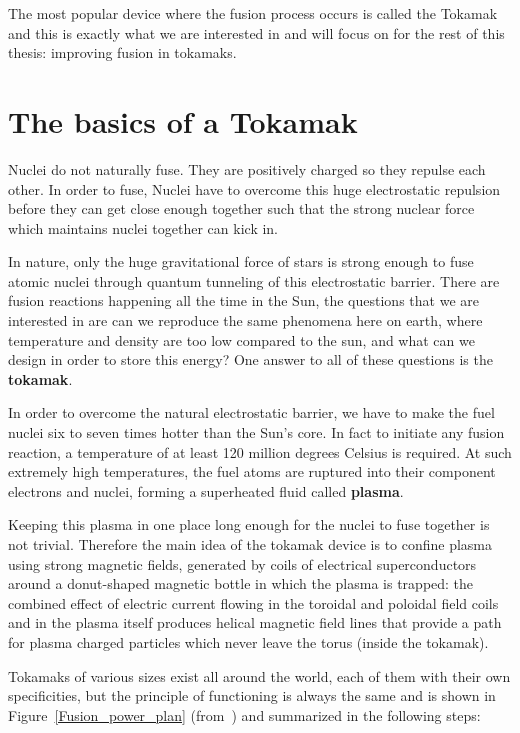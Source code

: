 \documentclass[12pt,lot, lof]{puthesis}
\begin{document}
The most popular device where the fusion process occurs is called the Tokamak and this is exactly what we are interested in and will focus on for the rest of this thesis: improving fusion in tokamaks.

\section{The basics of a Tokamak}

Nuclei do not naturally fuse. They are positively charged so they repulse each other. In order to fuse, Nuclei have to overcome this huge electrostatic repulsion before they can get close enough together such that the strong nuclear force which maintains nuclei together can kick in.

In nature, only the huge gravitational force of stars is strong enough to fuse atomic nuclei  through quantum tunneling of this electrostatic barrier. There are fusion reactions happening all the time in the Sun, the questions that we are interested in are can we reproduce the same phenomena here on earth, where temperature and density are too low compared to the sun, and what can we design in order to store this energy? One answer to all of these questions is the \textbf{tokamak}.

In order to overcome the natural electrostatic barrier, we have to make the fuel nuclei six to seven times hotter than the Sun's core. In fact to initiate any fusion reaction, a temperature of at least 120 million degrees Celsius is required. At such extremely high temperatures, the fuel atoms are ruptured into their component electrons and nuclei, forming a superheated fluid called \textbf{plasma}.

Keeping this plasma in one place long enough for the nuclei to fuse together is not trivial. Therefore the main idea of the tokamak device is to confine plasma using strong magnetic fields, generated by coils of electrical superconductors around a donut-shaped magnetic bottle in which the plasma is trapped: the combined effect of electric current flowing in the toroidal and poloidal field coils and in the plasma itself  produces helical magnetic field lines that provide a path for plasma charged particles which never leave the torus (inside the tokamak).


Tokamaks of various sizes exist all around the world, each of them with their own specificities, but the principle of functioning is always the same and is shown in Figure~\ref{Fusion_power_plan} (from~\cite{Mccracken12}) and summarized in the following steps:
\end{document}
